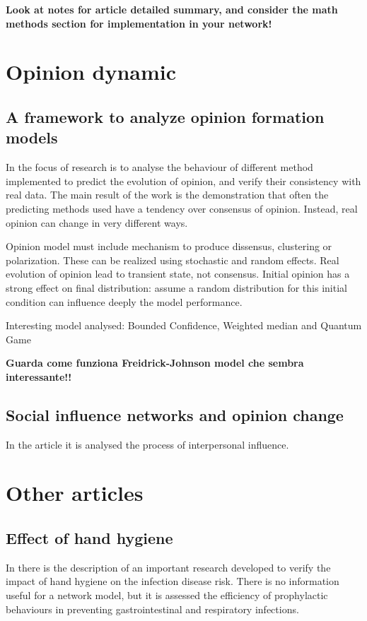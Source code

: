 \documentclass[a4paper,11pt]{scrartcl}
\begin{document}
\textbf{Look at notes for article detailed summary, and consider the math methods section for implementation in your network!}

\section{Opinion dynamic}

	\subsection{A framework to analyze opinion formation models}
	In \cite{Devia2022} the focus of research is to analyse the behaviour of different method implemented to predict the evolution of opinion, and verify their consistency with real data. The main result of the work is the demonstration that often the predicting methods used have a tendency over consensus of opinion. Instead, real opinion can change in very different ways. 
	  	
	  Opinion model must include mechanism to produce dissensus, clustering or polarization. These can be realized using stochastic and random effects. Real evolution of opinion lead to transient state, not consensus. Initial opinion has a strong effect on final distribution: assume a random distribution for this initial condition can influence deeply the model performance. 
	  
	  Interesting model analysed: Bounded Confidence, Weighted median and Quantum Game
	  
	  \textbf{Guarda come funziona Freidrick-Johnson model che sembra interessante!!}
	  
	  \subsection{Social influence networks and opinion change}
	  In the article \cite{Friedkin99} it is analysed the process of interpersonal influence. 
	  	
	  	
\section{Other articles}
	
		\subsection{Effect of hand hygiene}
		In \cite{Aiello2008} there is the description of an important research developed to verify the impact of hand hygiene on the infection disease risk. There is no information useful for a network model, but it is assessed the efficiency of prophylactic behaviours in preventing gastrointestinal and respiratory infections. 
		
\end{document}
